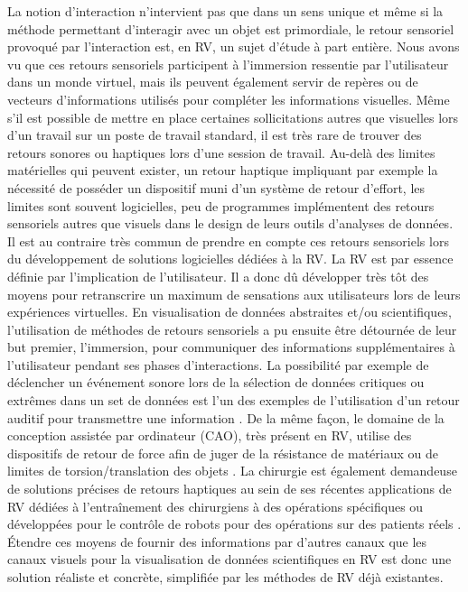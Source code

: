 La notion d'interaction n'intervient pas que dans un sens unique et même si la méthode permettant d'interagir avec un objet est primordiale, le retour sensoriel provoqué par l'interaction est, en RV, un sujet d'étude à part entière. Nous avons vu que ces retours sensoriels participent à l'immersion ressentie par l'utilisateur dans un monde virtuel, mais ils peuvent également servir de repères ou de vecteurs d'informations utilisés pour compléter les informations visuelles. Même s'il est possible de mettre en place certaines sollicitations autres que visuelles lors d'un travail sur un poste de travail standard, il est très rare de trouver des retours sonores ou haptiques lors d'une session de travail. Au-delà des limites matérielles qui peuvent exister, un retour haptique impliquant par exemple la nécessité de posséder un dispositif muni d'un système de retour d'effort, les limites sont souvent logicielles, peu de programmes implémentent des retours sensoriels autres que visuels dans le design de leurs outils d'analyses de données. Il est au contraire très commun de prendre en compte ces retours sensoriels lors du développement de solutions logicielles dédiées à la RV. La RV est par essence définie par l'implication de l'utilisateur. Il a donc dû développer très tôt des moyens pour retranscrire un maximum de sensations aux utilisateurs lors de leurs expériences virtuelles. En visualisation de données abstraites et/ou scientifiques, l'utilisation de méthodes de retours sensoriels a pu ensuite être détournée de leur but premier, l'immersion, pour communiquer des informations supplémentaires à l'utilisateur pendant ses phases d'interactions. La possibilité par exemple de déclencher un événement sonore lors de la sélection de données critiques ou extrêmes dans un set de données est l'un des exemples de l'utilisation d'un retour auditif pour transmettre une information \cite{ferey_multisensory_2009}. De la même façon, le domaine de la conception assistée par ordinateur (CAO), très présent en RV, utilise des dispositifs de retour de force afin de juger de la résistance de matériaux ou de limites de torsion/translation des objets \cite{sun2010haptic}. La chirurgie est également demandeuse de solutions précises de retours haptiques au sein de ses récentes applications de RV dédiées à l’entraînement des chirurgiens à des opérations spécifiques ou développées pour le contrôle de robots pour des opérations sur des patients réels \cite{kusumoto_application_2006}. Étendre ces moyens de fournir des informations par d'autres canaux que les canaux visuels pour la visualisation de données scientifiques en RV est donc une solution réaliste et concrète, simplifiée par les méthodes de RV déjà existantes.


